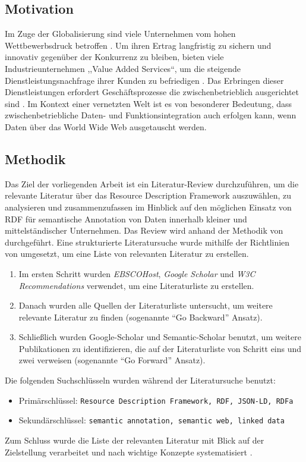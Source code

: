 \documentclass[float=false, crop=false]{standalone}
\begin{document}
\subsection{Motivation}
Im Zuge der Globalisierung sind viele Unternehmen vom hohen Wettbewerbsdruck betroffen \autocite[vgl.][]{alt2013handbuch}. Um ihren Ertrag langfristig zu sichern und innovativ gegenüber der Konkurrenz zu bleiben, bieten viele Industrieunternehmen ,,Value Added Services``, um die steigende Dienstleistungsnachfrage ihrer Kunden zu befriedigen \autocite[vgl.][S. 4]{Meffert2015}. Das Erbringen dieser Dienstleistungen erfordert Geschäftsprozesse die zwischenbetrieblich ausgerichtet sind \autocite[vgl.][S.19]{fleisch2001netzwerkunternehmen}. Im Kontext einer vernetzten Welt \autocite[vgl.][]{bmwi2013} ist es von besonderer Bedeutung, dass zwischenbetriebliche Daten- und Funktionsintegration auch erfolgen kann, wenn Daten über das World Wide Web ausgetauscht werden. 

\subsection{Methodik}
Das Ziel der vorliegenden Arbeit ist ein Literatur-Review durchzuführen, um die relevante Literatur über das Resource Description Framework auszuwählen, zu analysieren und zusammenzufassen im Hinblick auf den möglichen Einsatz von RDF für semantische Annotation von Daten innerhalb kleiner und mittelständischer Unternehmen. Das Review wird anhand der Methodik von \cite{fettke2006state} durchgeführt. Eine strukturierte Literatursuche wurde mithilfe der Richtlinien von \cite[S. XVI]{webster2002analyzing} umgesetzt, um eine Liste von relevanten Literatur zu erstellen. 
\begin{enumerate}
	\item Im ersten Schritt wurden \emph{EBSCOHost}, \emph{Google Scholar} und \emph{W3C Recommendations} verwendet, um eine Literaturliste zu erstellen.
	\item Danach wurden alle Quellen der Literaturliste untersucht, um weitere relevante Literatur zu finden (sogenannte \hyphenquote{german}{Go Backward} Ansatz).
	\item Schließlich wurden Google-Scholar und Semantic-Scholar benutzt, um weitere Publikationen zu identifizieren, die auf der Literaturliste von Schritt eins und zwei verweisen (sogenannte \hyphenquote{german}{Go Forward} Ansatz).
\end{enumerate}
Die folgenden Suchschlüsseln wurden während der Literatursuche benutzt:
\begin{itemize}
	\item Primärschlüssel: \texttt{Resource Description Framework, RDF, JSON-LD, RDFa}
	\item Sekundärschlüssel: \texttt{semantic annotation, semantic web, linked data}
\end{itemize}
Zum Schluss wurde die Liste der relevanten Literatur mit Blick auf der Zielstellung verarbeitet und nach wichtige Konzepte systematisiert \autocite[vgl.][S. XVI]{webster2002analyzing}.
\end{document}

